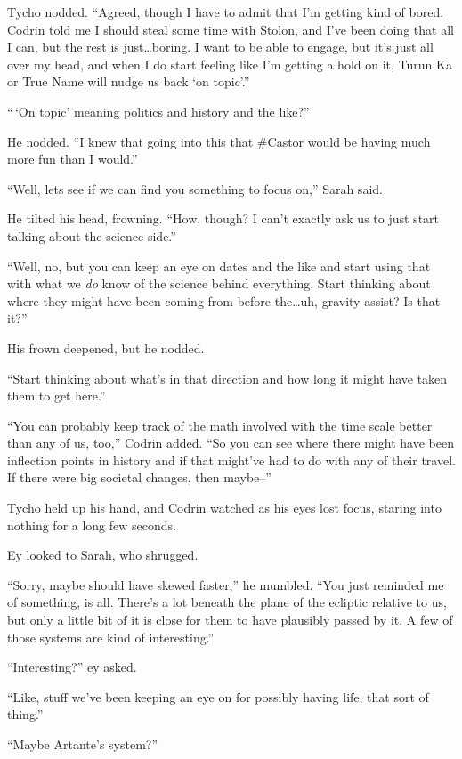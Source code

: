 Tycho nodded. ``Agreed, though I have to admit that I'm getting kind of bored. Codrin told me I should steal some time with Stolon, and I've been doing that all I can, but the rest is just\ldots boring. I want to be able to engage, but it's just all over my head, and when I do start feeling like I'm getting a hold on it, Turun Ka or True Name will nudge us back `on topic'.''

``\,`On topic' meaning politics and history and the like?''

He nodded. ``I knew that going into this that \#Castor would be having much more fun than I would.''

``Well, lets see if we can find you something to focus on,'' Sarah said.

He tilted his head, frowning. ``How, though? I can't exactly ask us to just start talking about the science side.''

``Well, no, but you can keep an eye on dates and the like and start using that with what we \emph{do} know of the science behind everything. Start thinking about where they might have been coming from before the\ldots uh, gravity assist? Is that it?''

His frown deepened, but he nodded.

``Start thinking about what's in that direction and how long it might have taken them to get here.''

``You can probably keep track of the math involved with the time scale better than any of us, too,'' Codrin added. ``So you can see where there might have been inflection points in history and if that might've had to do with any of their travel. If there were big societal changes, then maybe--''

Tycho held up his hand, and Codrin watched as his eyes lost focus, staring into nothing for a long few seconds.

Ey looked to Sarah, who shrugged.

``Sorry, maybe should have skewed faster,'' he mumbled. ``You just reminded me of something, is all. There's a lot beneath the plane of the ecliptic relative to us, but only a little bit of it is close for them to have plausibly passed by it. A few of those systems are kind of interesting.''

``Interesting?'' ey asked.

``Like, stuff we've been keeping an eye on for possibly having life, that sort of thing.''

``Maybe Artante's system?''

